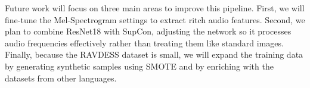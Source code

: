 \documentclass[12pt,hitec]{report}
\begin{document}
Future work will focus on three main areas to improve this pipeline. First, we will fine-tune the Mel-Spectrogram settings to extract ritch audio features. Second, we plan to combine ResNet18 with SupCon, adjusting the network so it processes audio frequencies effectively rather than treating them like standard images. Finally, because the RAVDESS dataset is small, we will expand the training data by generating synthetic samples using SMOTE and by enriching with the datasets from other languages.



\clearpage 
\nocite{*}
{} 
\begingroup 
\footnotesize 


\endgroup 
\end{document}
